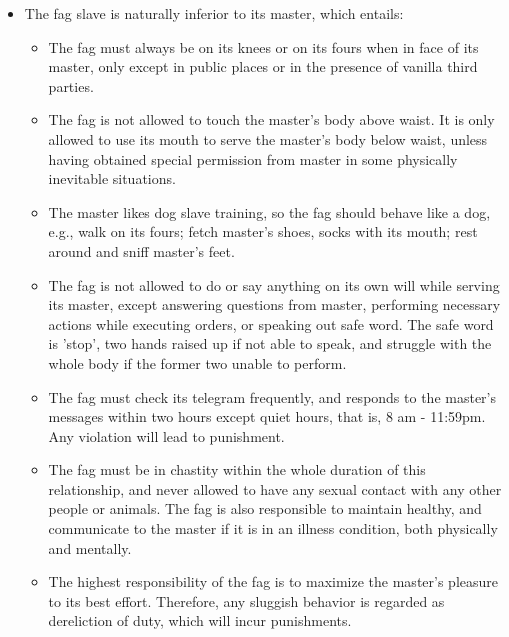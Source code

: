 \documentclass[a4paper,fontset=ubuntu,12pt]{ctexart}
\begin{document}
\begin{itemize}
    \item The fag slave is naturally inferior to its master, which entails:
    
        \begin{itemize}
            \item The fag must always be on its knees or on its fours when in face of its master, only except in public places or in the presence of vanilla third parties.
            
            \item The fag is not allowed to touch the master's body above waist. It is only allowed to use its mouth to serve the master's body below waist, unless having obtained special permission from master in some physically inevitable situations.
            
            \item The master likes dog slave training, so the fag should behave like a dog, e.g., walk on its fours; fetch master's shoes, socks with its mouth; rest around and sniff master's feet. 
            
            \item The fag is not allowed to do or say anything on its own will while serving its master, except answering questions from master, performing necessary actions while executing orders, or speaking out safe word. The safe word is 'stop', two hands raised up if not able to speak, and struggle with the whole body if the former two unable to perform.  
            
            \item The fag must check its telegram frequently, and responds to the master's messages within two hours except quiet hours, that is, 8 am - 11:59pm. Any violation will lead to punishment.
            
            \item The fag must be in chastity within the whole duration of this relationship, and never allowed to have any sexual contact with any other people or animals. The fag is also responsible to maintain healthy, and communicate to the master if it is in an illness condition, both physically and mentally.
            
            \item The highest responsibility of the fag is to maximize the master's pleasure to its best effort. Therefore, any sluggish behavior is regarded as dereliction of duty, which will incur punishments.
            

\end{itemize}
\end{itemize}
\end{document}
